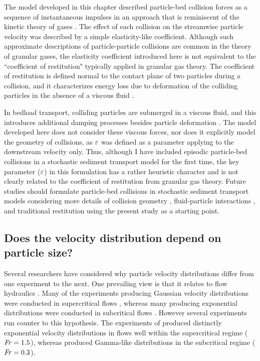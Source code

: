 The model developed in this chapter described particle-bed collision forces as a sequence of instantaneous impulses in an approach that is reminiscent of the kinetic theory of gases \citep{Landau1969,Brilliantov2004}.
The effect of each collision on the streamwise particle velocity was described by a simple elasticity-like coefficient.
Although such approximate descriptions of particle-particle collisions are common in the theory of granular gases, the elasticity coefficient introduced here is not equivalent to the ``coefficient of restitution" typically applied in granular gas theory.
The coefficient of restitution is defined normal to the contact plane of two particles during a collision, and it characterizes energy loss due to deformation of the colliding particles in the absence of a viscous fluid \citep{Brach1992,Ismail2008}.

In bedload transport, colliding particles are submerged in a viscous fluid, and this introduces additional damping processes besides particle deformation \citep{Joseph2001,Yang2006,Schmeeckle2001}.
The model developed here does not consider these viscous forces, nor does it explicitly model the geometry of collisions, as $\varepsilon$ was defined as a parameter applying to the downstream velocity only.
Thus, although I have included episodic particle-bed collisions in a stochastic sediment transport model for the first time, the key parameter ($\varepsilon$) in this formulation has a rather heuristic character and is not clearly related to the coefficient of restitution from granular gas theory.
Future studies should formulate particle-bed collisions in stochastic sediment transport models considering more details of collision geometry \citep{Sekine1992}, fluid-particle interactions \citep{Marshall2011}, and traditional restitution \citep{Brach1989} using the present study as a starting point. 

\subsection{Does the velocity distribution depend on particle size?}

Several researchers have considered why particle velocity distributions differ from one experiment to the next.
One prevailing view is that it relates to flow hydraulics \citep{Wu2020}. Many of the experiments producing Gaussian velocity distributions were conducted in supercritical flows \citep[e.g.][]{Heyman2016,Martin2012,Ancey2014}, whereas many producing exponential distributions were conducted in subcritical flows \citep[e.g.][]{Fathel2015,Charru2004,Seizilles2014}.
However several experiments run counter to this hypothesis.
The experiments of \citet{Lajeunesse2010} produced distinctly exponential velocity distributions in flows well within the supercritical regime ($\mbox{\textit{Fr}}=1.5$), whereas \citet{Liu2019} produced Gamma-like distributions in the subcritical regime ($\mbox{\textit{Fr}}=0.3$).

